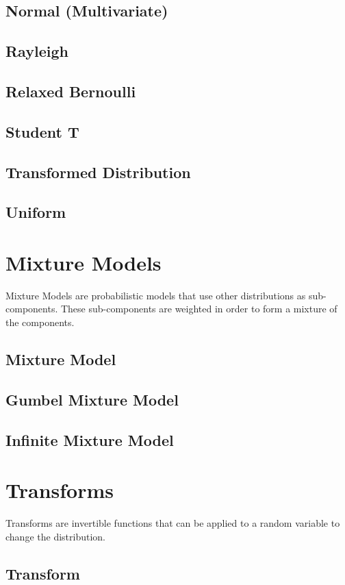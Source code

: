 \documentclass{article}
\begin{document}
\subsection{Normal (Multivariate)}
\subsection{Rayleigh}
\subsection{Relaxed Bernoulli}
\subsection{Student T}
\subsection{Transformed Distribution}
\subsection{Uniform}

\section{Mixture Models}
Mixture Models are probabilistic models that use other distributions as sub-components.
These sub-components are weighted in order to form a mixture of the components.
\subsection{Mixture Model}
\subsection{Gumbel Mixture Model}
\subsection{Infinite Mixture Model}

\section{Transforms}
Transforms are invertible functions that can be applied to a
random variable to change the distribution.
\subsection{Transform}
\end{document}
